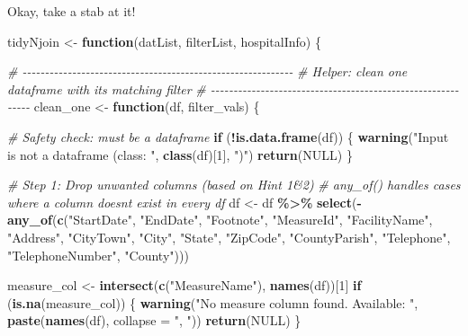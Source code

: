 \documentclass[
]{article}
\newenvironment{Shaded}{\begin{snugshade}}{\end{snugshade}}
\newcommand{\AttributeTok}[1]{\textcolor[rgb]{0.13,0.29,0.53}{#1}}
\newcommand{\CommentTok}[1]{\textcolor[rgb]{0.56,0.35,0.01}{\textit{#1}}}
\newcommand{\ConstantTok}[1]{\textcolor[rgb]{0.56,0.35,0.01}{#1}}
\newcommand{\ControlFlowTok}[1]{\textcolor[rgb]{0.13,0.29,0.53}{\textbf{#1}}}
\newcommand{\DecValTok}[1]{\textcolor[rgb]{0.00,0.00,0.81}{#1}}
\newcommand{\FunctionTok}[1]{\textcolor[rgb]{0.13,0.29,0.53}{\textbf{#1}}}
\newcommand{\NormalTok}[1]{#1}
\newcommand{\OtherTok}[1]{\textcolor[rgb]{0.56,0.35,0.01}{#1}}
\newcommand{\SpecialCharTok}[1]{\textcolor[rgb]{0.81,0.36,0.00}{\textbf{#1}}}
\newcommand{\StringTok}[1]{\textcolor[rgb]{0.31,0.60,0.02}{#1}}
\begin{document}
Okay, take a stab at it!

\begin{Shaded}
\begin{Highlighting}[]
\NormalTok{tidyNjoin }\OtherTok{\textless{}{-}} \ControlFlowTok{function}\NormalTok{(datList, filterList, hospitalInfo) \{}
  
  \CommentTok{\# {-}{-}{-}{-}{-}{-}{-}{-}{-}{-}{-}{-}{-}{-}{-}{-}{-}{-}{-}{-}{-}{-}{-}{-}{-}{-}{-}{-}{-}{-}{-}{-}{-}{-}{-}{-}{-}{-}{-}{-}{-}{-}{-}{-}{-}{-}{-}{-}{-}{-}{-}{-}{-}{-}{-}{-}{-}{-}{-}{-}}
  \CommentTok{\# Helper: clean one dataframe with its matching filter}
  \CommentTok{\# {-}{-}{-}{-}{-}{-}{-}{-}{-}{-}{-}{-}{-}{-}{-}{-}{-}{-}{-}{-}{-}{-}{-}{-}{-}{-}{-}{-}{-}{-}{-}{-}{-}{-}{-}{-}{-}{-}{-}{-}{-}{-}{-}{-}{-}{-}{-}{-}{-}{-}{-}{-}{-}{-}{-}{-}{-}{-}{-}{-}}
\NormalTok{  clean\_one }\OtherTok{\textless{}{-}} \ControlFlowTok{function}\NormalTok{(df, filter\_vals) \{}
    
      \CommentTok{\# Safety check: must be a dataframe}
      \ControlFlowTok{if}\NormalTok{ (}\SpecialCharTok{!}\FunctionTok{is.data.frame}\NormalTok{(df)) \{}
            \FunctionTok{warning}\NormalTok{(}\StringTok{"Input is not a dataframe (class: "}\NormalTok{, }\FunctionTok{class}\NormalTok{(df)[}\DecValTok{1}\NormalTok{], }\StringTok{")"}\NormalTok{)}
            \FunctionTok{return}\NormalTok{(}\ConstantTok{NULL}\NormalTok{)}
\NormalTok{      \}}
        
  
    \CommentTok{\# Step 1: Drop unwanted columns (based on Hint 1\&2)}
    \CommentTok{\# any\_of() handles cases where a column doesn\textquotesingle{}t exist in every df}
\NormalTok{    df }\OtherTok{\textless{}{-}}\NormalTok{ df }\SpecialCharTok{\%\textgreater{}\%}
      \FunctionTok{select}\NormalTok{(}\SpecialCharTok{{-}}\FunctionTok{any\_of}\NormalTok{(}\FunctionTok{c}\NormalTok{(}\StringTok{"StartDate"}\NormalTok{, }\StringTok{"EndDate"}\NormalTok{, }\StringTok{"Footnote"}\NormalTok{, }\StringTok{"MeasureId"}\NormalTok{,}
                       \StringTok{"FacilityName"}\NormalTok{, }\StringTok{"Address"}\NormalTok{, }\StringTok{"CityTown"}\NormalTok{, }\StringTok{"City"}\NormalTok{,}
                       \StringTok{"State"}\NormalTok{, }\StringTok{"ZipCode"}\NormalTok{, }\StringTok{"CountyParish"}\NormalTok{, }\StringTok{"Telephone"}\NormalTok{,}
                       \StringTok{"TelephoneNumber"}\NormalTok{, }\StringTok{"County"}\NormalTok{)))}
    
   
\NormalTok{    measure\_col }\OtherTok{\textless{}{-}} \FunctionTok{intersect}\NormalTok{(}\FunctionTok{c}\NormalTok{(}\StringTok{"MeasureName"}\NormalTok{), }\FunctionTok{names}\NormalTok{(df))[}\DecValTok{1}\NormalTok{]}
    \ControlFlowTok{if}\NormalTok{ (}\FunctionTok{is.na}\NormalTok{(measure\_col)) \{}
        \FunctionTok{warning}\NormalTok{(}\StringTok{"No measure column found. Available: "}\NormalTok{, }
                \FunctionTok{paste}\NormalTok{(}\FunctionTok{names}\NormalTok{(df), }\AttributeTok{collapse =} \StringTok{", "}\NormalTok{))}
        \FunctionTok{return}\NormalTok{(}\ConstantTok{NULL}\NormalTok{)}
\NormalTok{    \}}
    

\end{Highlighting}
\end{Shaded}
\end{document}
